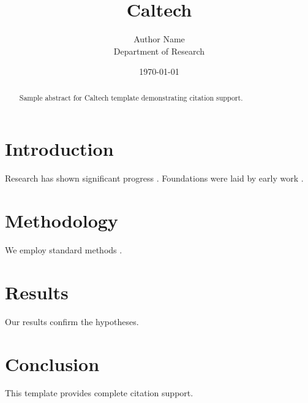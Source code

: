 \documentclass{thesis_caltech}
\title{Caltech}
\author{Author Name \\ \small Department of Research}
\date{\today}
\begin{document}
\maketitle

\begin{abstract}
Sample abstract for Caltech template demonstrating citation support.
\end{abstract}

\section{Introduction}
Research has shown significant progress \citep{einstein1905}. Foundations were laid by early work \citep{turing1950}.

\section{Methodology}
We employ standard methods \citep{knuth1984}.

\section{Results}
Our results confirm the hypotheses.

\section{Conclusion}
This template provides complete citation support.



\end{document}
